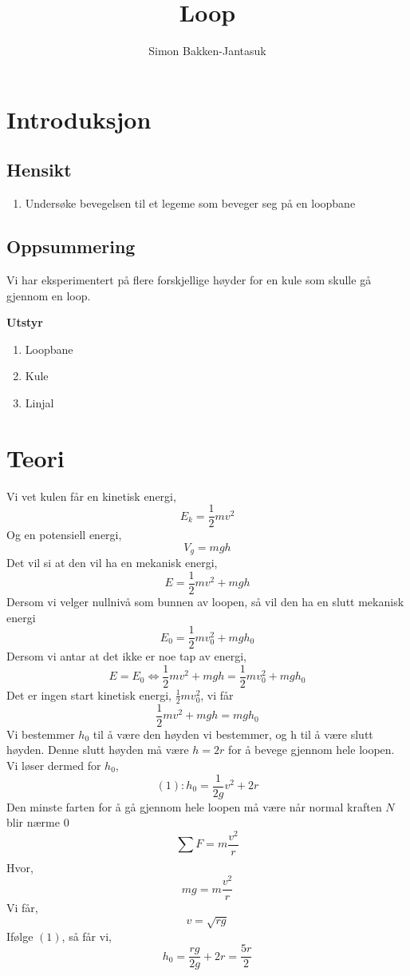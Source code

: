\documentclass[a4paper]{article}
\title{Loop}
\author{Simon Bakken-Jantasuk}
\begin{document}
\maketitle

\tableofcontents

\listoffigures

\listoftables

\pagebreak

\section{Introduksjon} %
\label{sec:introduksjon}
\subsection{Hensikt} %
\label{sub:hensikt}
\begin{flushleft}
	\begin{enumerate}
		\item Undersøke bevegelsen til et legeme som beveger seg på en loopbane
	\end{enumerate}
\end{flushleft}
\subsection{Oppsummering} %
\label{sub:oppsummering}
\begin{flushleft}
	Vi har eksperimentert på flere forskjellige høyder for en kule som skulle gå gjennom en loop.
\end{flushleft}

\textbf{Utstyr} 
\begin{enumerate}
	\item Loopbane 
	\item Kule
	\item Linjal
\end{enumerate}

\section{Teori} %
\label{sec:teori}
Vi vet kulen får en kinetisk energi, 
\[
E_k = \frac{1}{2}mv^2 
\]
Og en potensiell energi,
\[
V_g = mgh
\]
Det vil si at den vil ha en mekanisk energi, 
\[
E = \frac{1}{2}mv^2 + mgh
\]
Dersom vi velger nullnivå som bunnen av loopen, så vil den ha en slutt mekanisk energi 
\[
E_0 = \frac{1}{2}mv_0^2+mgh_0
\]
Dersom vi antar at det ikke er noe tap av energi,
\[
E = E_0 \Leftrightarrow \frac{1}{2}mv^2 + mgh = \frac{1}{2}mv_0^2 + mgh_0
\]
Det er ingen start kinetisk energi, $\frac{1}{2}mv_0^2$, vi får
\[
\frac{1}{2}mv^2 + mgh = mgh_0
\]
Vi bestemmer $h_0$ til å være den høyden vi bestemmer, og h til å være slutt høyden. Denne slutt høyden må være $h = 2r$ for å bevege gjennom hele loopen. Vi løser dermed for $h_0$,
\[
	(1): h_0 = \frac{1}{2g}v^2 + 2r 
\]
Den minste farten for å gå gjennom hele loopen må være når 
normal kraften $N$ blir nærme  $0$
 \[
\sum_{}^{}F =  m \frac{v^2}{r}
\]
Hvor,
\[
mg = m \frac{v^2}{r}
\]
Vi får, 
\[
v = \sqrt{rg} 
\]
Ifølge $(1)$, så får vi,
 \[
h_0 = \frac{rg}{2g} + 2r = \frac{5r}{2} 
\]
\end{document}
